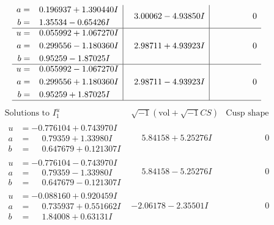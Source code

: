 \documentclass[1p]{elsarticle_modified}
\theoremstyle{definition}
\newcommand{\I}{\sqrt{-1}}
\begin{document}
$$\begin{array}{c|c|c}
\begin{aligned}
a &= \phantom{-}0.196937 + 1.390440 I \\
b &= \phantom{-}1.35534 - 0.65426 I\end{aligned}
 & \phantom{-}3.00062 - 4.93850 I & \phantom{-0.000000 } 0 \\ \hline\begin{aligned}
u &= \phantom{-}0.055992 + 1.067270 I \\
a &= \phantom{-}0.299556 - 1.180360 I \\
b &= \phantom{-}0.95259 - 1.87025 I\end{aligned}
 & \phantom{-}2.98711 + 4.93923 I & \phantom{-0.000000 } 0 \\ \hline\begin{aligned}
u &= \phantom{-}0.055992 - 1.067270 I \\
a &= \phantom{-}0.299556 + 1.180360 I \\
b &= \phantom{-}0.95259 + 1.87025 I\end{aligned}
 & \phantom{-}2.98711 - 4.93923 I & \phantom{-0.000000 } 0\\
 \hline 
 \end{array}$$\newpage$$\begin{array}{c|c|c}  
\text{Solutions to }I^u_{1}& \I (\text{vol} + \sqrt{-1}CS) & \text{Cusp shape}\\
 \hline 
\begin{aligned}
u &= -0.776104 + 0.743970 I \\
a &= \phantom{-}0.79359 + 1.33980 I \\
b &= \phantom{-}0.647679 + 0.121307 I\end{aligned}
 & \phantom{-}5.84158 + 5.25276 I & \phantom{-0.000000 } 0 \\ \hline\begin{aligned}
u &= -0.776104 - 0.743970 I \\
a &= \phantom{-}0.79359 - 1.33980 I \\
b &= \phantom{-}0.647679 - 0.121307 I\end{aligned}
 & \phantom{-}5.84158 - 5.25276 I & \phantom{-0.000000 } 0 \\ \hline\begin{aligned}
u &= -0.088160 + 0.920459 I \\
a &= \phantom{-}0.735937 + 0.551662 I \\
b &= \phantom{-}1.84008 + 0.63131 I\end{aligned}
 & -2.06178 - 2.35501 I & \phantom{-0.000000 } 0 \\ \hline\begin{aligned}

\end{aligned}
\end{array}$$
\end{document}
